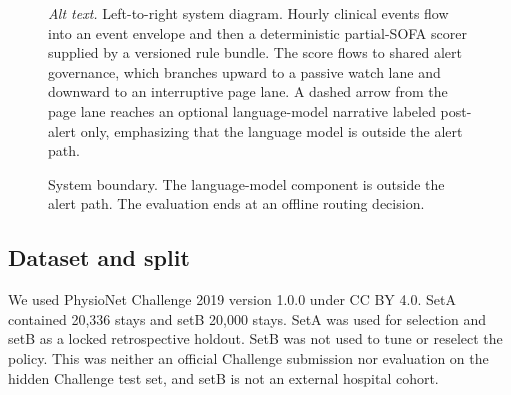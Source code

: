 \documentclass[11pt]{article}
\begin{document}
\begin{figure}[htbp]
\centering
{}
\caption{System boundary. The language-model component is outside the alert
path. The evaluation ends at an offline routing decision.}
\label{fig:system}

\noindent\textit{Alt text.} Left-to-right system diagram. Hourly clinical events
flow into an event envelope and then a deterministic partial-SOFA scorer
supplied by a versioned rule bundle. The score flows to shared alert
governance, which branches upward to a passive watch lane and downward to an
interruptive page lane. A dashed arrow from the page lane reaches an optional
language-model narrative labeled post-alert only, emphasizing that the
language model is outside the alert path.
\end{figure}

\subsection{Dataset and split}
We used PhysioNet Challenge 2019 version 1.0.0 under CC BY 4.0. SetA contained
20,336 stays and setB 20,000 stays.\citep{reyna2020ccm,reyna2019physionet} SetA
was used for selection and setB as a locked retrospective holdout. SetB was not
used to tune or reselect the policy. This was neither an official Challenge
submission nor evaluation on the hidden Challenge test set, and setB is not an
external hospital cohort.
\end{document}
